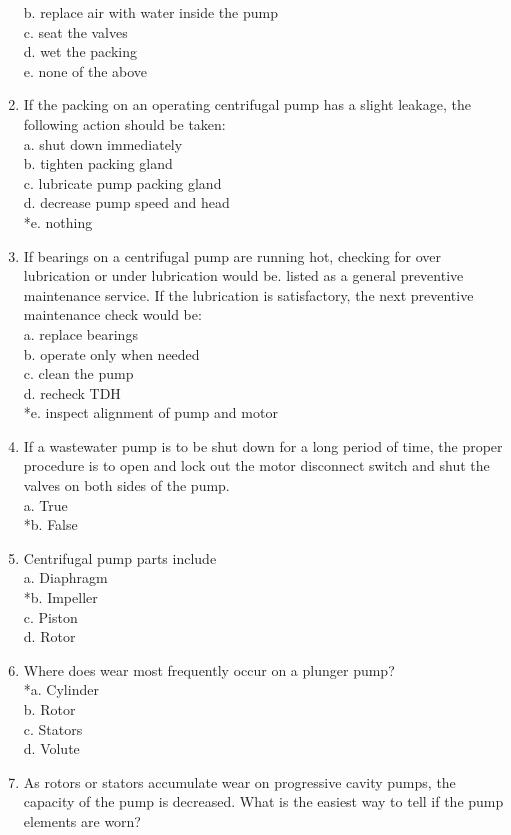 \begin{enumerate}[1.]
b. replace air with water inside the pump\\
c. seat the valves\\
d. wet the packing\\
e. none of the above\\
\item If the packing on an operating centrifugal pump has a slight leakage, the following action should be taken:\\
a. shut down immediately\\
b. tighten packing gland\\
c. lubricate pump packing gland\\
d. decrease pump speed and head\\
*e. nothing\\
\item If bearings on a centrifugal pump are running hot, checking for over lubrication or under lubrication would be. listed as a general preventive maintenance service. If the lubrication is satisfactory, the next preventive maintenance check would be:\\
a. replace bearings\\
b. operate only when needed\\
c. clean the pump\\
d. recheck TDH\\
*e. inspect alignment of pump and motor\\
\item If a wastewater pump is to be shut down for a long period of time, the proper procedure is to open and lock out the motor disconnect switch and shut the valves on both sides of the pump.\\
a. True\\
*b. False\\
\item Centrifugal pump parts include\\
a. Diaphragm\\
*b. Impeller\\
c. Piston\\
d. Rotor\\
\item Where does wear most frequently occur on a plunger pump?\\
*a. Cylinder\\
b. Rotor\\
c. Stators\\
d. Volute\\
\item As rotors or stators accumulate wear on progressive cavity pumps, the capacity of the pump is decreased. What is the easiest way to tell if the pump elements are worn?\\

\end{enumerate}
